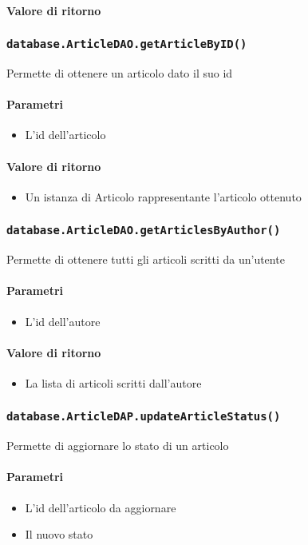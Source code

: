 \paragraph{Valore di ritorno}

\subsubsection{\texttt{database.ArticleDAO.getArticleByID()}}
Permette di ottenere un articolo dato il suo id
\paragraph{Parametri}
\begin{itemize}
\item L'id dell'articolo
\end{itemize}
\paragraph{Valore di ritorno}
\begin{itemize}
\item Un istanza di Articolo rappresentante l'articolo ottenuto
\end{itemize}

\subsubsection{\texttt{database.ArticleDAO.getArticlesByAuthor()}}
Permette di ottenere tutti gli articoli scritti da un'utente
\paragraph{Parametri}
\begin{itemize}
\item L'id dell'autore
\end{itemize}
\paragraph{Valore di ritorno}
\begin{itemize}
\item La lista di articoli scritti dall'autore
\end{itemize}

\subsubsection{\texttt{database.ArticleDAP.updateArticleStatus()}}
Permette di aggiornare lo stato di un articolo
\paragraph{Parametri}
\begin{itemize}
\item L'id dell'articolo da aggiornare
\item Il nuovo stato
\end{itemize}
